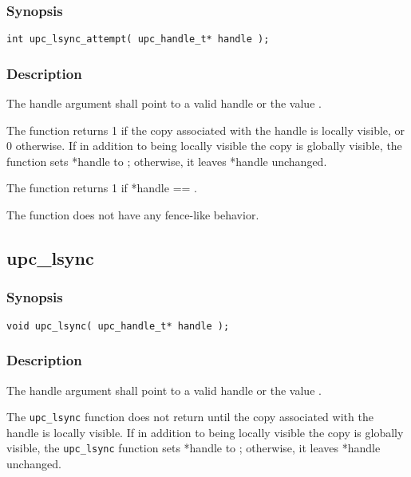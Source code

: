 \subsubsection{Synopsis}

\begin{verbatim}
int upc_lsync_attempt( upc_handle_t* handle ); 
\end{verbatim}

\subsubsection{Description}

\npf The handle argument shall point to a valid handle or the value
\complete{}.

\np The \function{} function returns 1 if the copy associated with the
handle is locally visible, or 0 otherwise.  If in addition to being locally
visible the copy is globally visible, the \function{} function sets *handle to
\complete{}; otherwise, it leaves *handle unchanged.

\np The \function{} function returns 1 if *handle == \complete{}.

\np The \function{} function does not have any fence-like behavior.

\subsection{upc\_lsync}
\def\function{{\tt upc\_lsync}}

\subsubsection{Synopsis}

\begin{verbatim}
void upc_lsync( upc_handle_t* handle );
\end{verbatim}

\subsubsection{Description}

\npf The handle argument shall point to a valid handle or the value
\complete{}.

\np The \function{} function does not return until the copy associated
with the handle is locally visible.  If in addition to being locally visible the
copy is globally visible, the \function{} function sets *handle to \complete{};
otherwise, it leaves *handle unchanged.

